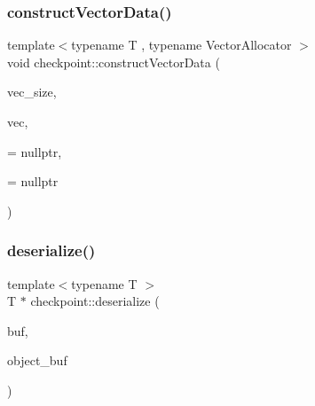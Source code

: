 \mbox{\label{namespacecheckpoint_ab21ae06103ddad9d211e21ea8c79b69f}} 
\subsubsection{\texorpdfstring{construct\+Vector\+Data()}{constructVectorData()}\hspace{0.1cm}{\footnotesize\ttfamily [3/3]}}
{\footnotesize\ttfamily template$<$typename T , typename Vector\+Allocator $>$ \\
void checkpoint\+::construct\+Vector\+Data (\begin{DoxyParamCaption}\item[{\hyperlink{namespacecheckpoint_a083f6674da3f94c2901b18c6d238217c}{Serial\+Size\+Type} const}]{vec\+\_\+size,  }\item[{std\+::vector$<$ T, Vector\+Allocator $>$ \&}]{vec,  }\item[{\hyperlink{namespacecheckpoint_a4032c86e7c92702198dd675a2696ee2c}{is\+Not\+Default\+Cons\+Type}$<$ T $>$ $\ast$}]{ = {\ttfamily nullptr},  }\item[{\hyperlink{namespacecheckpoint_a141a100f9dcca06fb0b6dbf44a5d6756}{is\+Not\+Copy\+Constructible}$<$ T $>$ $\ast$}]{ = {\ttfamily nullptr} }\end{DoxyParamCaption})}

\mbox{\label{namespacecheckpoint_aee0d7387d339b0275e9b95634748d63b}} 
\subsubsection{\texorpdfstring{deserialize()}{deserialize()}\hspace{0.1cm}{\footnotesize\ttfamily [1/3]}}
{\footnotesize\ttfamily template$<$typename T $>$ \\
T $\ast$ checkpoint\+::deserialize (\begin{DoxyParamCaption}\item[{char $\ast$}]{buf,  }\item[{char $\ast$}]{object\+\_\+buf }\end{DoxyParamCaption})}



